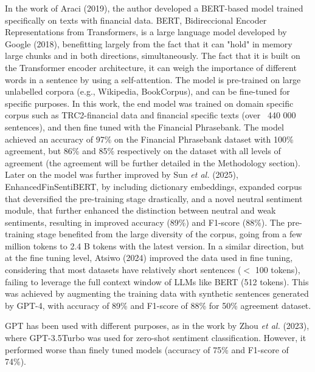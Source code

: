 \documentclass[conference]{IEEEtran}
\begin{document}
In the work of Araci (2019), the author developed a BERT-based model trained specifically on texts with financial data. BERT, Bidireccional Encoder Representations from Transformers, is a large language model developed by Google (2018), benefitting largely from the fact that it can "hold" in memory large chunks and in both directions, simultaneously. The fact that it is built on the Transformer encoder architecture, it can weigh the importance of different words in a sentence by using a self-attention. The model is pre-trained  on large unlabelled corpora (e.g., Wikipedia, BookCorpus), and can be fine-tuned for specific purposes. In this work, the end model was trained on  domain specific corpus such as TRC2-financial data and financial specific texts (over ~440 000 sentences), and then fine tuned with the Financial Phrasebank. The model achieved an accuracy of 97\% on the Financial Phrasebank dataset with 100\% agreement, but 86\% and 85\% respectively on the dataset with all levels of agreement (the agreement will be further detailed in the Methodology section). Later on the model was further improved by Sun \textit{et al.} (2025), EnhancedFinSentiBERT, by including dictionary embeddings, expanded corpus that deversified the pre-training stage drastically, and a novel neutral sentiment module, that further enhanced the distinction between neutral and weak sentiments, resulting in improved accuracy (89\%) and F1-score (88\%). The pre-training stage benefited from the large diversity of the corpus, going from a few million tokens to 2.4 B tokens with the latest version. 
In a similar direction, but at the fine tuning level, Atsiwo (2024) improved the data used in fine tuning, considering that most datasets have relatively short sentences ($<$ 100 tokens), failing to leverage the full context window  of LLMs like BERT (512 tokens). This was achieved by augmenting  the training data with synthetic sentences generated by GPT-4, with accuracy of 89\% and F1-score of 88\% for 50\% agreement dataset. 

GPT has been used with different purposes, as in the work by Zhou \textit{et al.} (2023), where GPT-3.5Turbo was used for zero-shot sentiment classification. However, it performed worse than finely tuned models (accuracy of 75\% and F1-score of 74\%).
\end{document}
